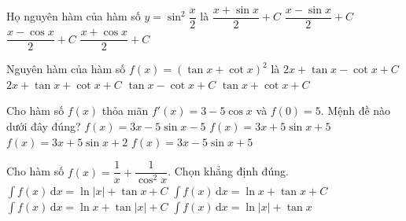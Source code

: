 \begin{ex}%
	 Họ nguyên hàm của hàm số $ y=\sin ^2\dfrac{x}{2}$ là
	\choice 
		{$\dfrac{x+\sin  x}{2}+C$}
		 {\True $\dfrac{x-\sin x}{2}+C$}
		 {$\dfrac{x-\cos x}{2}+C$}
		{$\dfrac{x+\cos x}{2}+C$} 
\end{ex}

\begin{ex}%
	Nguyên hàm của hàm số $f(x)=(\tan x+\cot  x)^2$ là
	 \choice
		{$2x+\tan x-\cot x+C$} 
		{$2x+\tan x+\cot x+C$} 
		{\True $\tan  x-\cot x+C$}
		{$\tan x+\cot x+C$} 
\end{ex}

\begin{ex}%
	Cho hàm số $f(x)$ thỏa  mãn $f'(x)=3-5\cos x$ và $f(0)=5$. Mệnh đề nào dưới đây đúng?
	 \choice
		{$f(x)=3x-5\sin x-5$} 
		 {$f(x)=3x+5\sin x+5$}
		 {$f(x)=3x+5\sin x+2$}
		{\True $f(x)=3x-5\sin  x+5$}
\end{ex}

\begin{ex}%
	Cho hàm số $f(x)=\dfrac{1}{x}+\dfrac{1}{\cos^2x}$. Chọn khẳng định đúng. 
	\choice 
		{\True $\displaystyle \int f(x)\mathrm{\,d}x=\ln  |x|+\tan x+C$}
		{$\displaystyle  \int f(x)\mathrm{\,d}x=\ln x+\tan x+C$}
		{$\displaystyle \int f(x)\mathrm{\,d}x=\ln x+\tan  |x|+C$}
		{$\displaystyle \int f(x)\mathrm{\,d}x=\ln  |x|+\tan x$}
\end{ex}

